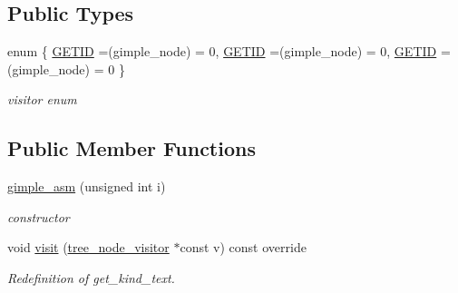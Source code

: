 \subsection*{Public Types}
\begin{DoxyCompactItemize}
\item 
enum \{ \hyperlink{structgimple__asm_a244c4ddd4d7b2a2c7873a70ed2c3fabeac1e47fe48400a742841c627a5f366957}{G\+E\+T\+ID} =(gimple\+\_\+node) = 0, 
\hyperlink{structgimple__asm_a244c4ddd4d7b2a2c7873a70ed2c3fabeac1e47fe48400a742841c627a5f366957}{G\+E\+T\+ID} =(gimple\+\_\+node) = 0, 
\hyperlink{structgimple__asm_a244c4ddd4d7b2a2c7873a70ed2c3fabeac1e47fe48400a742841c627a5f366957}{G\+E\+T\+ID} =(gimple\+\_\+node) = 0
 \}\begin{DoxyCompactList}\small\item\em visitor enum \end{DoxyCompactList}
\end{DoxyCompactItemize}
\subsection*{Public Member Functions}
\begin{DoxyCompactItemize}
\item 
\hyperlink{structgimple__asm_a78182926d19aac60e20c49dfa311e1ab}{gimple\+\_\+asm} (unsigned int i)
\begin{DoxyCompactList}\small\item\em constructor \end{DoxyCompactList}\item 
void \hyperlink{structgimple__asm_ac2ba4ccbf1f1085bcf1e0c9d6c06d706}{visit} (\hyperlink{classtree__node__visitor}{tree\+\_\+node\+\_\+visitor} $\ast$const v) const override
\begin{DoxyCompactList}\small\item\em Redefinition of get\+\_\+kind\+\_\+text. \end{DoxyCompactList}\end{DoxyCompactItemize}
